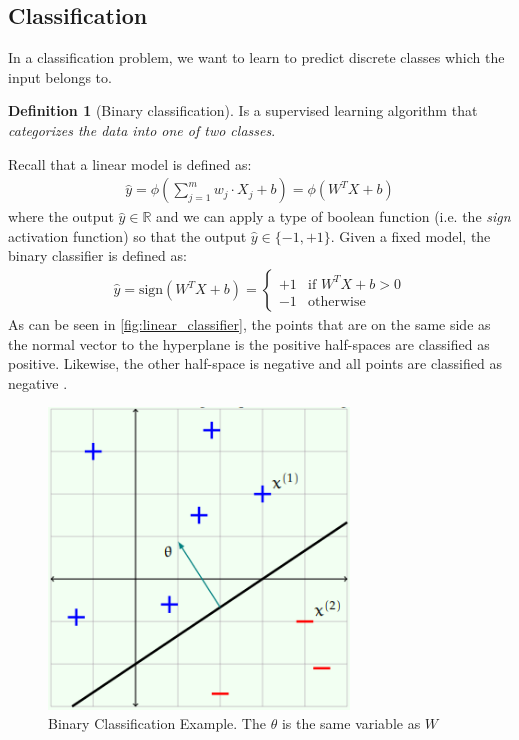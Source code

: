 \documentclass[11pt]{article}
\numberwithin{equation}{section}
\theoremstyle{definition}%
\newtheorem{definition}{Definition}[section]%
\begin{document}
\subsection{Classification}

In a classification problem, we want to learn to predict discrete classes which the input belongs to. 

\begin{definition}[Binary classification] Is a supervised learning algorithm that \emph{categorizes the data into one of two classes}.
\end{definition}

Recall that a linear model is defined as: 
\begin{align}
    \hat{y} = \phi \left (\sum_{j=1}^{m}{w_j \cdot X_j + b} \right ) = \phi (W^{T}X + b)
\end{align}
% 
where the output $\hat{y} \in \mathbb{R}$ and we can apply a type of boolean function (i.e. the \emph{sign} activation function) so that the output $\hat{y} \in \{-1, +1\}$. Given a fixed model, the binary classifier is defined as:
\begin{align}
    \hat{y} = \text{sign}(W^{T}X + b) = \begin{cases}
        +1 & \text{if $W^{T}X + b > 0$}\\
        -1 & \text{otherwise}
    \end{cases}
\end{align}
As can be seen in \autoref{fig:linear_classifier}, the points that are on the same side as the normal vector to the hyperplane is the positive half-spaces are classified as positive. Likewise, the other half-space is negative and all points are classified as negative \cite{MIT}. 
\begin{figure}[h]%
    \centering
    \includegraphics[width=8cm]{./Figs/linear_classifer.png}%
    \qquad
    \caption{Binary Classification Example. The $\theta$ is the same variable as $W$ \cite{MIT}}%
    \label{fig:linear_classifier}%
\end{figure}
\end{document}
